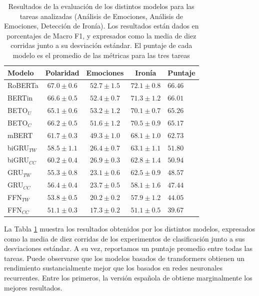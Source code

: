 \begin{table}[t]
    \centering
    \large
    \begin{tabular}{l ccc l}
        \toprule
        Modelo         &  Polaridad         & Emociones         &   Ironía        &  Puntaje \\
        \hline
        RoBERTa        &  $67.0 \pm 0.6$ &  $52.7 \pm 1.5$ & $72.1 \pm 0.8$ & $66.46$ \\
        BERTin         &  $66.6 \pm 0.5$ &  $52.4 \pm 0.7$ & $71.3 \pm 1.2$ & $66.01$ \\
        BETO$_U$       &  $65.1 \pm 0.6$ &  $53.2 \pm 1.2$ & $70.1 \pm 0.7$ & $65.26$ \\
        BETO$_C$       &  $66.2 \pm 0.5$ &  $51.6 \pm 1.2$ & $70.5 \pm 0.9$ & $65.17$ \\
        mBERT          &  $61.7 \pm 0.3$ &  $49.3 \pm 1.0$ & $68.1 \pm 1.0$ & $62.73$ \\
        \hline
        biGRU$_{TW}$   &  $58.5 \pm 1.1$ &  $26.4 \pm 0.7$ & $63.1 \pm 1.1$ & $51.80$ \\
        biGRU$_{CC}$   &  $60.2 \pm 0.4$ &  $26.9 \pm 0.3$ & $62.8 \pm 1.4$ & $50.94$ \\
        GRU$_{TW}$     &  $55.3 \pm 0.8$ &  $23.1 \pm 0.6$ & $62.5 \pm 0.9$ & $48.57$ \\
        GRU$_{CC}$     &  $56.4 \pm 0.4$ &  $23.7 \pm 0.5$ & $58.1 \pm 1.6$ & $47.44$ \\
        FFN$_{TW}$     &  $53.8 \pm 0.5$ &  $20.2 \pm 0.2$ & $57.9 \pm 1.2$ & $44.05$ \\
        FFN$_{CC}$     &  $51.1 \pm 0.3$ &  $17.3 \pm 0.2$ & $51.1 \pm 0.5$ & $39.67$ \\

        \hline
    \end{tabular}
    \caption{Resultados de la evaluación de los distintos modelos para las tareas analizadas (Análisis de Emociones, Análisis de Emociones, Detección de Ironía). Los resultados están dados en porcentajes de Macro F1, y expresados como la media de diez corridas junto a su desviación estándar. El puntaje de cada modelo es el promedio de las métricas para las tres tareas}
    \label{tab:03_classification_results}
\end{table}

La Tabla \ref{tab:03_classification_results} muestra los resultados obtenidos por los distintos modelos, expresados como la media de diez corridas de los experimentos de clasificación junto a sus desviaciones estándar. A su vez, reportamos un puntaje promedio entre todas las tareas. Puede observarse que los modelos basados de transformers obtienen un rendimiento sustancialmente mejor que los basados en redes neuronales recurrentes. Entre los primeros, la versión española de \roberta{} obtiene marginalmente los mejores resultados.

